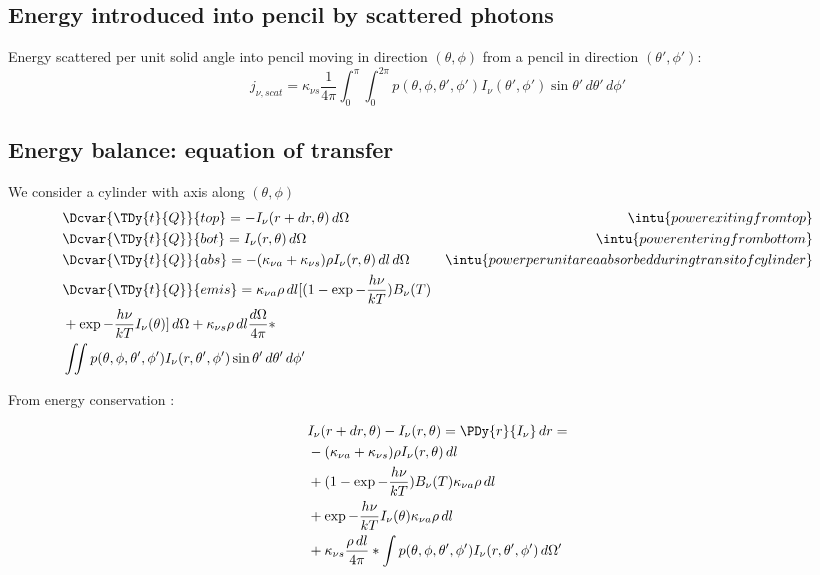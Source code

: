 \documentclass[oneside,12pt,fleqn]{memoir}
\begin{document}
\subsection{Energy introduced into pencil by scattered photons}

Energy scattered per unit solid angle into pencil moving in direction $(\theta,\phi)$ from a pencil in direction $(\theta',\phi')$:
\begin{equation*}
j_{\nu,scat}=\kappa_{\nu s}\frac{1}{4\pi}\int_0^{\pi}\int_0^{2\pi}p(\theta,\phi,\theta',\phi')I_{\nu}(\theta',\phi')\sin{\theta'}\,d\theta'\,d\phi'
\end{equation*}

\subsection{Energy balance: equation of transfer}

We consider a cylinder with axis along $(\theta,\phi)$
\begin{align*}
&\Dcvar{\TDy{t}{Q}}{top}=-I_{\nu}(r+dr,\theta)\,d\Omega&\intu{power exiting from top}\\
&\Dcvar{\TDy{t}{Q}}{bot}=I_{\nu}(r,\theta)\,d\Omega&\intu{power entering from bottom}\\
&\Dcvar{\TDy{t}{Q}}{abs}=-(\kappa_{\nu a}+\kappa_{\nu s})\rho I_{\nu}(r,\theta)\,dl\,d\Omega&\intu{power per unit area absorbed during transit of cylinder}\\
&\Dcvar{\TDy{t}{Q}}{emis}=\kappa_{\nu a}\rho\,dl[(1-\exp{-\frac{h\nu}{kT}})B_{\nu}(T)\\
&+\exp{-\frac{h\nu}{kT}}I_{\nu}(\theta)]\,d\Omega+\kappa_{\nu s}\rho\,dl\frac{d\Omega}{4\pi}*\\
&\iint p(\theta,\phi,\theta',\phi')I_{\nu}(r,\theta',\phi')\sin{\theta'}\,d\theta'\,d\phi'
\end{align*}

From energy conservation :

\begin{align*}
&I_{\nu}(r+dr,\theta)-I_{\nu}(r,\theta)=\PDy{r}{I_{\nu}}\,dr=\\
&-(\kappa_{\nu a}+\kappa_{\nu s})\rho I_{\nu}(r,\theta)\,dl\\
&+(1-\exp{-\frac{h\nu}{kT}})B_{\nu}(T)\kappa_{\nu a}\rho\,dl\\
&+\exp{-\frac{h\nu}{kT}}I_{\nu}(\theta)\kappa_{\nu a}\rho\,dl\\
&+\kappa_{\nu s}\frac{\rho\,dl}{4\pi}*\int p(\theta,\phi,\theta',\phi')I_{\nu}(r,\theta',\phi')\,d\Omega'
\end{align*}
\end{document}
